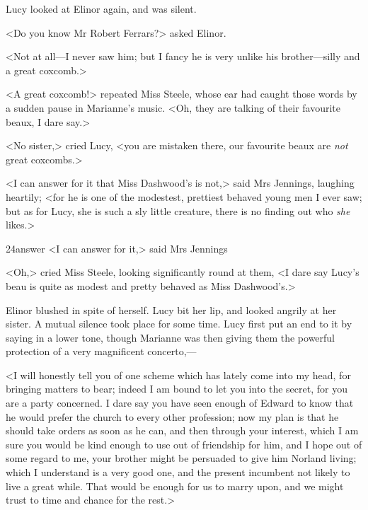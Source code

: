 Lucy looked at Elinor again, and was silent.

<Do you know Mr Robert Ferrars?> asked Elinor.

<Not at all—I never saw him; but I fancy he is very unlike his brother—silly and a great coxcomb.>

<A great coxcomb!> repeated Miss Steele, whose ear had caught those words by a sudden pause in Marianne's music. <Oh, they are talking of their favourite beaux, I dare say.>

<No sister,> cried Lucy, <you are mistaken there, our favourite beaux are \textit{not} great coxcombs.>

<I can answer for it that Miss Dashwood's is not,> said Mrs Jennings, laughing heartily; <for he is one of the modestest, prettiest behaved young men I ever saw; but as for Lucy, she is such a sly little creature, there is no finding out who \textit{she} likes.>


\begin{bwbigpic}
	[1.0]
	{24answer} 
	{<I can answer for it,> said Mrs Jennings} 
\end{bwbigpic}

<Oh,> cried Miss Steele, looking significantly round at them, <I dare say Lucy's beau is quite as modest and pretty behaved as Miss Dashwood's.>

Elinor blushed in spite of herself. Lucy bit her lip, and looked angrily at her sister. A mutual silence took place for some time. Lucy first put an end to it by saying in a lower tone, though Marianne was then giving them the powerful protection of a very magnificent concerto,—

<I will honestly tell you of one scheme which has lately come into my head, for bringing matters to bear; indeed I am bound to let you into the secret, for you are a party concerned. I dare say you have seen enough of Edward to know that he would prefer the church to every other profession; now my plan is that he should take orders as soon as he can, and then through your interest, which I am sure you would be kind enough to use out of friendship for him, and I hope out of some regard to me, your brother might be persuaded to give him Norland living; which I understand is a very good one, and the present incumbent not likely to live a great while. That would be enough for us to marry upon, and we might trust to time and chance for the rest.>

